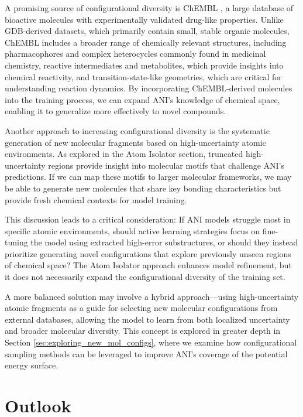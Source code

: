 A promising source of configurational diversity is ChEMBL \cite{ChEMBL_gaulton}, a large database of bioactive molecules with experimentally validated drug-like properties. Unlike GDB-derived datasets, which primarily contain small, stable organic molecules, ChEMBL includes a broader range of chemically relevant structures, including pharmacophores and complex heterocycles commonly found in medicinal chemistry, reactive intermediates and metabolites, which provide insights into chemical reactivity, and transition-state-like geometries, which are critical for understanding reaction dynamics. By incorporating ChEMBL-derived molecules into the training process, we can expand ANI’s knowledge of chemical space, enabling it to generalize more effectively to novel compounds.

Another approach to increasing configurational diversity is the systematic generation of new molecular fragments based on high-uncertainty atomic environments. As explored in the Atom Isolator section, truncated high-uncertainty regions provide insight into molecular motifs that challenge ANI’s predictions. If we can map these motifs to larger molecular frameworks, we may be able to generate new molecules that share key bonding characteristics but provide fresh chemical contexts for model training.

This discussion leads to a critical consideration: If ANI models struggle most in specific atomic environments, should active learning strategies focus on fine-tuning the model using extracted high-error substructures, or should they instead prioritize generating novel configurations that explore previously unseen regions of chemical space? The Atom Isolator approach enhances model refinement, but it does not necessarily expand the configurational diversity of the training set.

A more balanced solution may involve a hybrid approach—using high-uncertainty atomic fragments as a guide for selecting new molecular configurations from external databases, allowing the model to learn from both localized uncertainty and broader molecular diversity. This concept is explored in greater depth in Section \ref{sec:exploring_new_mol_configs}, where we examine how configurational sampling methods can be leveraged to improve ANI’s coverage of the potential energy surface.

\section{Outlook}

